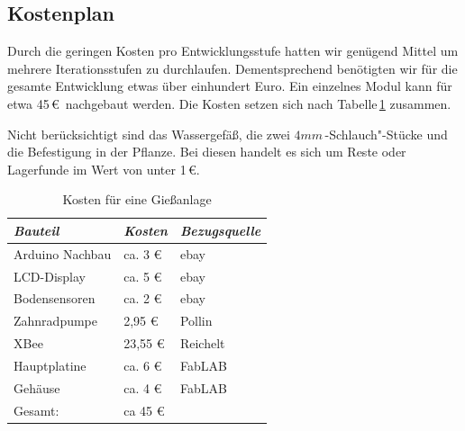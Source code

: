 \subsection{Kostenplan}

 Durch die geringen Kosten pro Entwicklungsstufe hatten wir genügend Mittel um mehrere Iterationsstufen  zu durchlaufen.
 Dementsprechend benötigten wir für die gesamte Entwicklung etwas über einhundert Euro.
 Ein einzelnes Modul kann für etwa 45\,\euro\ nachgebaut werden. 
 Die Kosten setzen sich nach Tabelle\,\ref{Kosten für eine Giessanlage} zusammen.
 
 Nicht berücksichtigt sind das Wassergefäß, die zwei \begin{math}4mm\end{math}\,-Schlauch"-Stücke und die Befestigung in der Pflanze.
 Bei diesen handelt es sich um Reste oder Lagerfunde im Wert von unter 1\,\euro. 

 
\begin{table}[ht]
	\centering
	\onehalfspacing
	\footnotesize
	\caption{Kosten für eine Gießanlage}
	\label{Kosten für eine Giessanlage}
		\begin{tabular}{|l|ll|}
			\hline
\textit{Bauteil} & \textit{Kosten} & \textit{Bezugsquelle} \\
\hline
Arduino Nachbau & ca. 3 \euro & ebay \\
LCD-Display & ca. 5 \euro & ebay\\
Bodensensoren & ca. 2 \euro & ebay \\
Zahnradpumpe & 2,95 \euro & Pollin \\
XBee &  23,55 \euro & Reichelt \\
Hauptplatine & ca. 6 \euro & FabLAB \\
Gehäuse	& ca. 4 \euro & FabLAB \\

\hline
Gesamt: & ca 45 \euro & \\
\hline
\end{tabular}
\end{table}
